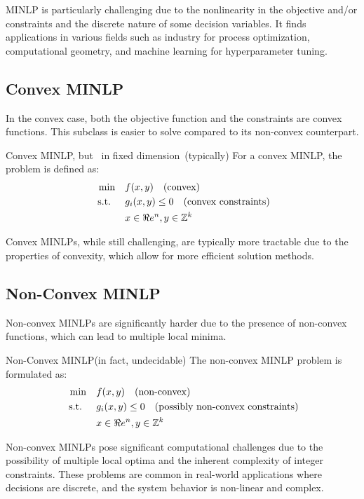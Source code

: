 MINLP is particularly challenging due to the nonlinearity in the objective and/or constraints and the discrete nature of some decision variables. It finds applications in various fields such as industry for process optimization, computational geometry, and machine learning for hyperparameter tuning.

\subsection{Convex MINLP}
In the convex case, both the objective function and the constraints are convex functions. This subclass is easier to solve compared to its non-convex counterpart.
\begin{general}{Convex MINLP}{\nphard, but \polynomial\ in fixed dimension\  (typically)}
For a convex MINLP, the problem is defined as:
\begin{equation}
\label{eq:convex-minlp}
\begin{split}
\min \quad & f(x, y) \quad \mbox{(convex)}\\
\mbox{ s.t. }  \quad & g_i(x, y) \leq 0  \quad  \mbox{(convex constraints)}\\
           & x \in \Re e^n, y \in \mathbb{Z}^k
\end{split}
\end{equation}
\end{general}
Convex MINLPs, while still challenging, are typically more tractable due to the properties of convexity, which allow for more efficient solution methods.

\subsection{Non-Convex MINLP}
Non-convex MINLPs are significantly harder due to the presence of non-convex functions, which can lead to multiple local minima.
\begin{general}{Non-Convex MINLP}{\nphard (in fact, undecidable)}
The non-convex MINLP problem is formulated as:
\begin{equation}
\label{eq:nonconvex-minlp}
\begin{split}
\min \quad & f(x, y) \quad
\mbox{(non-convex)}\\
\mbox{ s.t. } \quad & g_i(x, y) \leq 0 \quad \mbox{(possibly non-convex constraints)}\\
& x \in \Re e^n, y \in \mathbb{Z}^k
\end{split}
\end{equation}
\end{general}
Non-convex MINLPs pose significant computational challenges due to the possibility of multiple local optima and the inherent complexity of integer constraints. These problems are common in real-world applications where decisions are discrete, and the system behavior is non-linear and complex.

